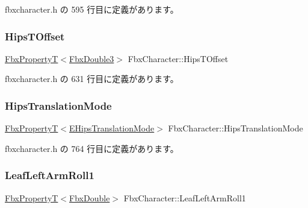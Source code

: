  fbxcharacter.\+h の 595 行目に定義があります。

\mbox{\label{class_fbx_character_af57834880f8f20bbb4c6eb241413be98}} 
\subsubsection{\texorpdfstring{Hips\+T\+Offset}{HipsTOffset}}
{\footnotesize\ttfamily \hyperlink{class_fbx_property_t}{Fbx\+PropertyT}$<$\hyperlink{fbxtypes_8h_ae0a96f14cde566774c7553aa7523b7a7}{Fbx\+Double3}$>$ Fbx\+Character\+::\+Hips\+T\+Offset}



 fbxcharacter.\+h の 631 行目に定義があります。

\mbox{\label{class_fbx_character_aa1b3da64538ec9daaf50daab0bf77b1f}} 
\subsubsection{\texorpdfstring{Hips\+Translation\+Mode}{HipsTranslationMode}}
{\footnotesize\ttfamily \hyperlink{class_fbx_property_t}{Fbx\+PropertyT}$<$\hyperlink{class_fbx_character_a908e56db46ed8467b779dbf39ec30952}{E\+Hips\+Translation\+Mode}$>$ Fbx\+Character\+::\+Hips\+Translation\+Mode}



 fbxcharacter.\+h の 764 行目に定義があります。

\mbox{\label{class_fbx_character_a06d07e0ace0fd744c0df69d43e49dc57}} 
\subsubsection{\texorpdfstring{Leaf\+Left\+Arm\+Roll1}{LeafLeftArmRoll1}}
{\footnotesize\ttfamily \hyperlink{class_fbx_property_t}{Fbx\+PropertyT}$<$\hyperlink{fbxtypes_8h_a171e72a1c46fc15c1a6c9c31948c1c5b}{Fbx\+Double}$>$ Fbx\+Character\+::\+Leaf\+Left\+Arm\+Roll1}



